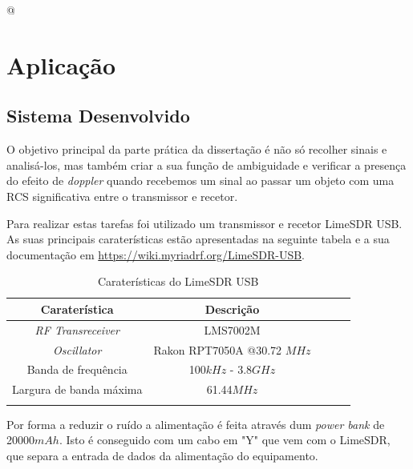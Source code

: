 @%

\chapter{Aplicação} %
\label{chap:Chapter5} %

\section{Sistema Desenvolvido}
O objetivo principal da parte prática da dissertação é não só recolher sinais e analisá-los, mas também criar a sua função de ambiguidade e verificar a presença do efeito de \textit{doppler} quando recebemos um sinal ao passar um objeto com uma \gls{RCS} significativa entre o transmissor e recetor.\par 
Para realizar estas tarefas foi utilizado um transmissor e recetor LimeSDR USB. As suas principais caraterísticas estão apresentadas na seguinte tabela e a sua documentação em \url{https://wiki.myriadrf.org/LimeSDR-USB}.\par

\begin{table}[h]
\centering
\begin{tabular}{@{}ccccc@{}}
\toprule
Caraterística       			 & Descrição                      \\ \midrule
\textit{RF Transreceiver}        & LMS7002M                       \\
\textit{Oscillator}    			 & Rakon RPT7050A @30.72 $MHz$    \\
Banda de frequência              & 100$kHz$ - 3.8$GHz$            \\ 
Largura de banda máxima          & 61.44$MHz$                     \\ \bottomrule
\label{tab:limesdr}
\end{tabular}
\caption[Caraterísticas do LimeSDR USB]{Caraterísticas do LimeSDR USB}
\end{table}

Por forma a reduzir o ruído a alimentação é feita através dum \textit{power bank} de 20000$mAh$. Isto é conseguido com um cabo em "Y" que vem com o LimeSDR, que separa a entrada de dados da alimentação do equipamento.

